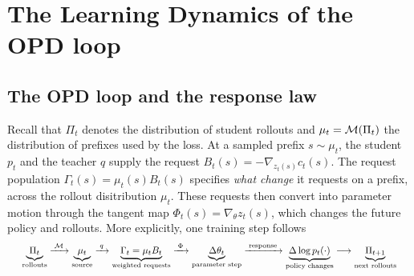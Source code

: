 \section{The Learning Dynamics of the OPD loop}
\label{sec:theory}
\label{sec:calculus}\label{sec:anatomy}

\subsection{The OPD loop and the response law}
\label{sec:loop}\label{sec:conversion:request}

Recall that $\Pi_t$ denotes the distribution of student rollouts and $\mu_t=\mathcal{M}(\Pi_t)$ the distribution of prefixes used by the loss. At a sampled prefix $s \sim \mu_t$, the student $p_t$ and the teacher $q$ supply the request $B_t(s)=-\nabla_{z_t(s)}c_t(s)$. The request population $\Gamma_t(s)=\mu_t(s)B_t(s)$ specifies \emph{what change} it requests on a prefix, across the rollout disitribution $\mu_t$. These requests then convert into parameter motion through the tangent map $\Phi_t(s)=\nabla_\theta z_t(s)$, which changes the future policy and rollouts. More explicitly, one training step follows
\begin{equation}
\resizebox{0.97\linewidth}{!}{$
\underbrace{\Pi_t}_{\text{rollouts}}
\xrightarrow{\;\cM\;}
\underbrace{\mu_t}_{\text{source}}
\xrightarrow{\;q\;}
\underbrace{\Gamma_t=\mu_tB_t}_{\text{weighted requests}}
\xrightarrow{\;\Phi\;}
\underbrace{\Delta\theta_t}_{\text{parameter step}}
\xrightarrow{\;\text{response}\;}
\underbrace{\Delta \log p_t(\cdot)}_{\text{policy changes}}
\longrightarrow
\underbrace{\Pi_{t+1}}_{\text{next rollouts}}
$}
\label{eq:loop}
\end{equation}





